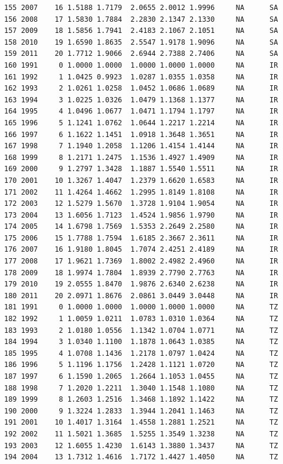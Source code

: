 \documentclass[preprint,authoryear,12pt]{elsarticle}\usepackage{graphicx, color}
\makeatletter
\newenvironment{kframe}{%
 \def\at@end@of@kframe{}%
 \ifinner\ifhmode%
  \def\at@end@of@kframe{\end{minipage}}%
  \begin{minipage}{\columnwidth}%
 \fi\fi%
 \def\FrameCommand##1{\hskip\@totalleftmargin \hskip-\fboxsep
 \colorbox{shadecolor}{##1}\hskip-\fboxsep
     \hskip-\linewidth \hskip-\@totalleftmargin \hskip\columnwidth}%
 \MakeFramed {\advance\hsize-\width
   \@totalleftmargin\z@ \linewidth\hsize
   \@setminipage}}%
 {\par\unskip\endMakeFramed%
 \at@end@of@kframe}
\newenvironment{knitrout}{}{} %
\makeatother
\begin{document}
\begin{knitrout}
\begin{kframe}
\begin{verbatim}
155 2007    16 1.5188 1.7179  2.0655 2.0012 1.9996     NA      SA
156 2008    17 1.5830 1.7884  2.2830 2.1347 2.1330     NA      SA
157 2009    18 1.5856 1.7941  2.4183 2.1067 2.1051     NA      SA
158 2010    19 1.6590 1.8635  2.5547 1.9178 1.9096     NA      SA
159 2011    20 1.7712 1.9066  2.6944 2.7388 2.7406     NA      SA
160 1991     0 1.0000 1.0000  1.0000 1.0000 1.0000     NA      IR
161 1992     1 1.0425 0.9923  1.0287 1.0355 1.0358     NA      IR
162 1993     2 1.0261 1.0258  1.0452 1.0686 1.0689     NA      IR
163 1994     3 1.0225 1.0326  1.0479 1.1368 1.1377     NA      IR
164 1995     4 1.0496 1.0677  1.0471 1.1794 1.1797     NA      IR
165 1996     5 1.1241 1.0762  1.0644 1.2217 1.2214     NA      IR
166 1997     6 1.1622 1.1451  1.0918 1.3648 1.3651     NA      IR
167 1998     7 1.1940 1.2058  1.1206 1.4154 1.4144     NA      IR
168 1999     8 1.2171 1.2475  1.1536 1.4927 1.4909     NA      IR
169 2000     9 1.2797 1.3428  1.1887 1.5540 1.5511     NA      IR
170 2001    10 1.3267 1.4047  1.2379 1.6620 1.6583     NA      IR
171 2002    11 1.4264 1.4662  1.2995 1.8149 1.8108     NA      IR
172 2003    12 1.5279 1.5670  1.3728 1.9104 1.9054     NA      IR
173 2004    13 1.6056 1.7123  1.4524 1.9856 1.9790     NA      IR
174 2005    14 1.6798 1.7569  1.5353 2.2649 2.2580     NA      IR
175 2006    15 1.7788 1.7594  1.6185 2.3667 2.3611     NA      IR
176 2007    16 1.9180 1.8045  1.7074 2.4251 2.4189     NA      IR
177 2008    17 1.9621 1.7369  1.8002 2.4982 2.4960     NA      IR
178 2009    18 1.9974 1.7804  1.8939 2.7790 2.7763     NA      IR
179 2010    19 2.0555 1.8470  1.9876 2.6340 2.6238     NA      IR
180 2011    20 2.0971 1.8676  2.0861 3.0449 3.0448     NA      IR
181 1991     0 1.0000 1.0000  1.0000 1.0000 1.0000     NA      TZ
182 1992     1 1.0059 1.0211  1.0783 1.0310 1.0364     NA      TZ
183 1993     2 1.0180 1.0556  1.1342 1.0704 1.0771     NA      TZ
184 1994     3 1.0340 1.1100  1.1878 1.0643 1.0385     NA      TZ
185 1995     4 1.0708 1.1436  1.2178 1.0797 1.0424     NA      TZ
186 1996     5 1.1196 1.1756  1.2428 1.1121 1.0720     NA      TZ
187 1997     6 1.1590 1.2065  1.2664 1.1053 1.0455     NA      TZ
188 1998     7 1.2020 1.2211  1.3040 1.1548 1.1080     NA      TZ
189 1999     8 1.2603 1.2516  1.3468 1.1892 1.1422     NA      TZ
190 2000     9 1.3224 1.2833  1.3944 1.2041 1.1463     NA      TZ
191 2001    10 1.4017 1.3164  1.4558 1.2881 1.2521     NA      TZ
192 2002    11 1.5021 1.3685  1.5255 1.3549 1.3238     NA      TZ
193 2003    12 1.6055 1.4230  1.6143 1.3880 1.3437     NA      TZ
194 2004    13 1.7312 1.4616  1.7172 1.4427 1.4050     NA      TZ

\end{verbatim}
\end{kframe}
\end{knitrout}
\end{document}
